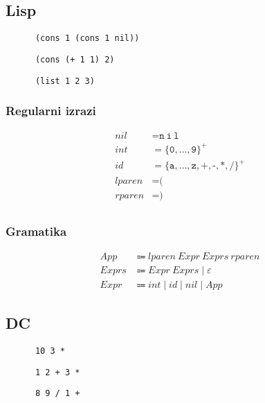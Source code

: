 \documentclass{report}
\newcommand{\Null}{\varepsilon}
\newcommand{\Char}[1]{\texttt{#1}}
\newcommand{\Spc}{\ }
\newcommand{\Union}{\mathrel{|}}
\newcommand{\KleenePlus}[1]{#1^+}
\newcommand{\Arrow}{\Coloneq}
\newcommand{\NT}[1]{{#1}}
\newcommand{\T}[1]{{#1}}
\begin{document}
    \subsection{Lisp}
    \begin{verbatim}
      (cons 1 (cons 1 nil))
    \end{verbatim}
    \begin{verbatim}
      (cons (+ 1 1) 2)
    \end{verbatim}
    \begin{verbatim}
      (list 1 2 3)
    \end{verbatim}

    \subsubsection*{Regularni izrazi}
    \begin{equation*}
      \begin{aligned}
        \T{nil} &= \Char{n} \Spc \Char{i} \Spc \Char{l}\\
        \T{int} &= \KleenePlus{\{\Char{0}, \dots, \Char{9}\}}\\
        \T{id} &= \KleenePlus{\{\Char{a}, \dots, \Char{z}, \Char{+}, \Char{-}, \Char{*}, \Char{/} \}}\\
        \T{lparen} &= \Char{(}\\
        \T{rparen} &= \Char{)}\\
      \end{aligned}
    \end{equation*}

    \subsubsection*{Gramatika}
    \begin{equation*}
      \begin{aligned}
        \NT{App} &\Arrow \T{lparen} \Spc \NT{Expr} \Spc \NT{Exprs} \Spc \T{rparen}\\
        \NT{Exprs} &\Arrow \NT{Expr} \Spc \NT{Exprs} \Union \Null\\
        \NT{Expr} &\Arrow \T{int} \Union \T{id} \Union \T{nil} \Union \NT{App}
      \end{aligned}
    \end{equation*}

    \subsection{DC}
    \begin{verbatim}
      10 3 *
    \end{verbatim}
    \begin{verbatim}
      1 2 + 3 *
    \end{verbatim}
    \begin{verbatim}
      8 9 / 1 +
    \end{verbatim}
\end{document}
